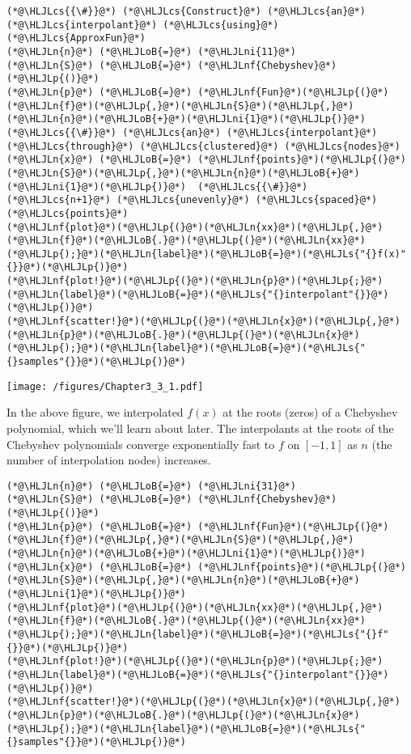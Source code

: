 \documentclass[12pt,a4paper]{article}
\newcommand{\HLJLn}[1]{#1}
\newcommand{\HLJLnf}[1]{\textcolor[RGB]{66,102,213}{#1}}
\newcommand{\HLJLs}[1]{\textcolor[RGB]{201,61,57}{#1}}
\newcommand{\HLJLni}[1]{\textcolor[RGB]{59,151,46}{#1}}
\newcommand{\HLJLoB}[1]{\textcolor[RGB]{102,102,102}{\textbf{#1}}}
\newcommand{\HLJLp}[1]{#1}
\newcommand{\HLJLcs}[1]{\textcolor[RGB]{153,153,119}{\textit{#1}}}
\begin{document}
\begin{lstlisting}
(*@\HLJLcs{{\#}}@*) (*@\HLJLcs{Construct}@*) (*@\HLJLcs{an}@*) (*@\HLJLcs{interpolant}@*) (*@\HLJLcs{using}@*) (*@\HLJLcs{ApproxFun}@*)
(*@\HLJLn{n}@*) (*@\HLJLoB{=}@*) (*@\HLJLni{11}@*)
(*@\HLJLn{S}@*) (*@\HLJLoB{=}@*) (*@\HLJLnf{Chebyshev}@*)(*@\HLJLp{()}@*)
(*@\HLJLn{p}@*) (*@\HLJLoB{=}@*) (*@\HLJLnf{Fun}@*)(*@\HLJLp{(}@*)(*@\HLJLn{f}@*)(*@\HLJLp{,}@*)(*@\HLJLn{S}@*)(*@\HLJLp{,}@*)(*@\HLJLn{n}@*)(*@\HLJLoB{+}@*)(*@\HLJLni{1}@*)(*@\HLJLp{)}@*) (*@\HLJLcs{{\#}}@*) (*@\HLJLcs{an}@*) (*@\HLJLcs{interpolant}@*) (*@\HLJLcs{through}@*) (*@\HLJLcs{clustered}@*) (*@\HLJLcs{nodes}@*)
(*@\HLJLn{x}@*) (*@\HLJLoB{=}@*) (*@\HLJLnf{points}@*)(*@\HLJLp{(}@*)(*@\HLJLn{S}@*)(*@\HLJLp{,}@*)(*@\HLJLn{n}@*)(*@\HLJLoB{+}@*)(*@\HLJLni{1}@*)(*@\HLJLp{)}@*)  (*@\HLJLcs{{\#}}@*) (*@\HLJLcs{n+1}@*) (*@\HLJLcs{unevenly}@*) (*@\HLJLcs{spaced}@*) (*@\HLJLcs{points}@*) 
(*@\HLJLnf{plot}@*)(*@\HLJLp{(}@*)(*@\HLJLn{xx}@*)(*@\HLJLp{,}@*)(*@\HLJLn{f}@*)(*@\HLJLoB{.}@*)(*@\HLJLp{(}@*)(*@\HLJLn{xx}@*)(*@\HLJLp{);}@*)(*@\HLJLn{label}@*)(*@\HLJLoB{=}@*)(*@\HLJLs{"{}f(x)"{}}@*)(*@\HLJLp{)}@*)
(*@\HLJLnf{plot!}@*)(*@\HLJLp{(}@*)(*@\HLJLn{p}@*)(*@\HLJLp{;}@*)(*@\HLJLn{label}@*)(*@\HLJLoB{=}@*)(*@\HLJLs{"{}interpolant"{}}@*)(*@\HLJLp{)}@*)
(*@\HLJLnf{scatter!}@*)(*@\HLJLp{(}@*)(*@\HLJLn{x}@*)(*@\HLJLp{,}@*)(*@\HLJLn{p}@*)(*@\HLJLoB{.}@*)(*@\HLJLp{(}@*)(*@\HLJLn{x}@*)(*@\HLJLp{);}@*)(*@\HLJLn{label}@*)(*@\HLJLoB{=}@*)(*@\HLJLs{"{}samples"{}}@*)(*@\HLJLp{)}@*)
\end{lstlisting}

\texttt{[image: /figures/Chapter3\_3\_1.pdf]}

In the above figure, we interpolated $f(x)$ at the roots (zeros) of a Chebyshev polynomial, which we'll learn about later.  The interpolants at the roots of the Chebyshev polynomials converge exponentially fast to $f$ on $[-1, 1]$ as $n$ (the number of interpolation nodes) increases.


\begin{lstlisting}
(*@\HLJLn{n}@*) (*@\HLJLoB{=}@*) (*@\HLJLni{31}@*)
(*@\HLJLn{S}@*) (*@\HLJLoB{=}@*) (*@\HLJLnf{Chebyshev}@*)(*@\HLJLp{()}@*)
(*@\HLJLn{p}@*) (*@\HLJLoB{=}@*) (*@\HLJLnf{Fun}@*)(*@\HLJLp{(}@*)(*@\HLJLn{f}@*)(*@\HLJLp{,}@*)(*@\HLJLn{S}@*)(*@\HLJLp{,}@*)(*@\HLJLn{n}@*)(*@\HLJLoB{+}@*)(*@\HLJLni{1}@*)(*@\HLJLp{)}@*) 
(*@\HLJLn{x}@*) (*@\HLJLoB{=}@*) (*@\HLJLnf{points}@*)(*@\HLJLp{(}@*)(*@\HLJLn{S}@*)(*@\HLJLp{,}@*)(*@\HLJLn{n}@*)(*@\HLJLoB{+}@*)(*@\HLJLni{1}@*)(*@\HLJLp{)}@*) 
(*@\HLJLnf{plot}@*)(*@\HLJLp{(}@*)(*@\HLJLn{xx}@*)(*@\HLJLp{,}@*)(*@\HLJLn{f}@*)(*@\HLJLoB{.}@*)(*@\HLJLp{(}@*)(*@\HLJLn{xx}@*)(*@\HLJLp{);}@*)(*@\HLJLn{label}@*)(*@\HLJLoB{=}@*)(*@\HLJLs{"{}f"{}}@*)(*@\HLJLp{)}@*)
(*@\HLJLnf{plot!}@*)(*@\HLJLp{(}@*)(*@\HLJLn{p}@*)(*@\HLJLp{;}@*)(*@\HLJLn{label}@*)(*@\HLJLoB{=}@*)(*@\HLJLs{"{}interpolant"{}}@*)(*@\HLJLp{)}@*)
(*@\HLJLnf{scatter!}@*)(*@\HLJLp{(}@*)(*@\HLJLn{x}@*)(*@\HLJLp{,}@*)(*@\HLJLn{p}@*)(*@\HLJLoB{.}@*)(*@\HLJLp{(}@*)(*@\HLJLn{x}@*)(*@\HLJLp{);}@*)(*@\HLJLn{label}@*)(*@\HLJLoB{=}@*)(*@\HLJLs{"{}samples"{}}@*)(*@\HLJLp{)}@*)
\end{lstlisting}
\end{document}
